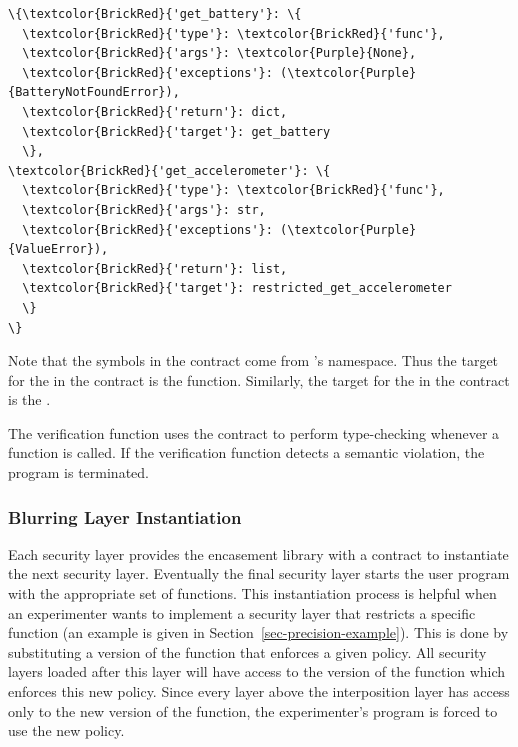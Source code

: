 \begin{Verbatim}
\{\textcolor{BrickRed}{'get_battery'}: \{
  \textcolor{BrickRed}{'type'}: \textcolor{BrickRed}{'func'},
  \textcolor{BrickRed}{'args'}: \textcolor{Purple}{None}, 
  \textcolor{BrickRed}{'exceptions'}: (\textcolor{Purple}{BatteryNotFoundError}), 
  \textcolor{BrickRed}{'return'}: dict,
  \textcolor{BrickRed}{'target'}: get_battery
  \}, 
\textcolor{BrickRed}{'get_accelerometer'}: \{
  \textcolor{BrickRed}{'type'}: \textcolor{BrickRed}{'func'},
  \textcolor{BrickRed}{'args'}: str, 
  \textcolor{BrickRed}{'exceptions'}: (\textcolor{Purple}{ValueError}), 
  \textcolor{BrickRed}{'return'}: list,
  \textcolor{BrickRed}{'target'}: restricted_get_accelerometer
  \}
\}
\end{Verbatim} 

Note that the symbols in the contract come from 's 
namespace. Thus the target for the  in the 
contract is the  function. Similarly, the 
target for the  in the contract is the 
.

The verification function uses the contract to perform
type-checking whenever a function is called. If the verification 
function detects a semantic violation, the program is terminated. 

\subsubsection{Blurring Layer Instantiation}

Each security layer provides the encasement library
with a contract to instantiate the next security layer. Eventually
the final security layer starts the user program with
the appropriate set of functions. This instantiation process
is helpful when an experimenter wants to implement a security
layer that restricts a specific function (an example is given in 
Section~\ref{sec-precision-example}). This is
done by substituting a version of the function that enforces
a given policy. All security layers loaded after this layer will
have access to the version of the function which enforces this
new policy. Since every layer above the interposition layer
has access only to the new version of the function, the experimenter's
program is forced to use the new policy.

